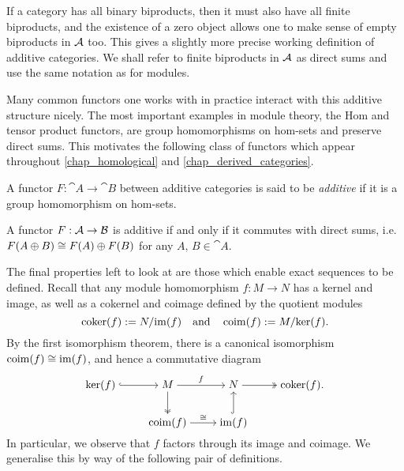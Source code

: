 If a category has all binary biproducts, then it must also have all
finite biproducts, and the existence of a zero object allows one to
make sense of empty biproducts in $\mathcal{A}$ too.
This gives a slightly more precise working definition of additive categories.
We shall refer to finite biproducts in $\mathcal{A}$ as direct sums and
use the same notation as for modules.

Many common functors one works with in practice interact with this
additive structure nicely.
The most important examples in module theory, the Hom and tensor
product functors, are group homomorphisms on hom-sets and preserve direct sums.
This motivates the following class of functors which appear
throughout \cref{chap_homological} and \cref{chap_derived_categories}.

\begin{definition}
  A functor $F: \cat{A} \to \cat{B}$ between additive categories is
  said to be \emph{additive} if it is a group homomorphism on hom-sets.
\end{definition}

\begin{lemma}
  \label{lemma_additive_func_commutes_with_dirsum}
  A functor $F: \mathcal{A} \to \mathcal{B}$ is additive if and only if
  it commutes with direct sums, i.e. $F(A \oplus B) \cong F(A)
  \oplus F(B)$ for any $A, \, B \in \cat{A}$.
\end{lemma}

The final properties left to look at are those which enable exact
sequences to be defined.
Recall that any module homomorphism $f: M \to N$ has a kernel and
image, as well as a cokernel and coimage defined by the quotient modules
\[
  \operatorname{coker}(f) := {N}\mathopen/{\operatorname{im}(f)}
  \quad \text{and} \quad
  \operatorname{coim}(f) := {M}\mathopen/{\ker(f)}.
\]
By the first isomorphism theorem, there is a canonical isomorphism
$\operatorname{coim}(f) \cong \operatorname{im}(f)$, and hence a commutative diagram
\begin{equation*}
  \label{eq_factoring_of_module_hom}
  \begin{tikzcd}[cramped]
    {\ker(f)} & M & N & {\coker(f)}. \\
    & {\coim(f)} & {\im(f)}
    \arrow[hook, from=1-1, to=1-2]
    \arrow["f", from=1-2, to=1-3]
    \arrow[two heads, from=1-2, to=2-2]
    \arrow[two heads, from=1-3, to=1-4]
    \arrow["\cong", from=2-2, to=2-3]
    \arrow[hook, from=2-3, to=1-3]
  \end{tikzcd}
\end{equation*}
In particular, we observe that $f$ factors through its image and coimage.
We generalise this by way of the following pair of definitions.

